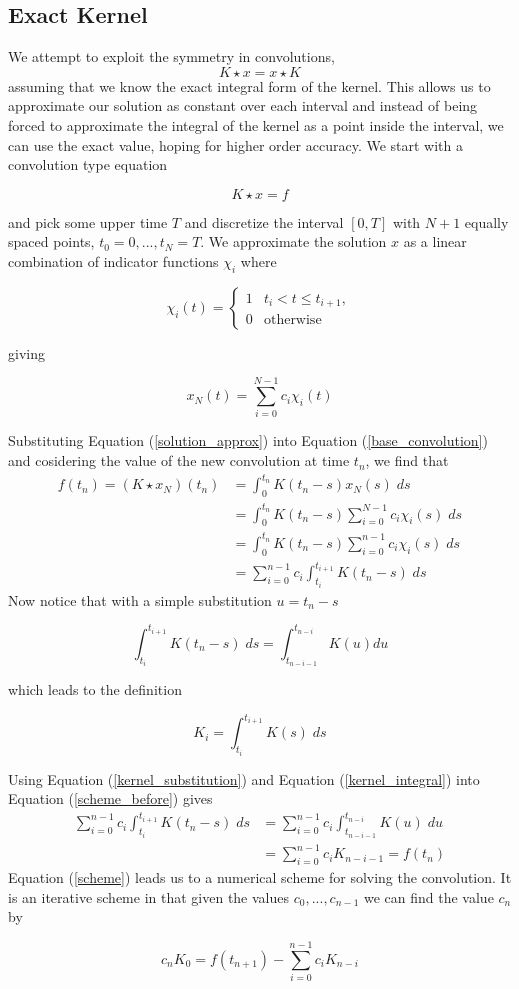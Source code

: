 \documentclass[11pt]{article}
\numberwithin{equation}{section}
\theoremstyle{definition}
\newcommand{\eqn}[2]{
  \begin{equation}
    \label{#1}
    #2
  \end{equation}
}
\newcommand{\eqr}[1]{Equation (\ref{#1})}
\begin{document}
\subsection{Exact Kernel}
We attempt to exploit the symmetry in convolutions, 
$$
  K \star x = x \star K
$$
assuming that we know the exact integral form of the kernel. This allows us to
approximate our solution as constant over each interval and instead of being forced
to approximate the integral of the kernel as a point inside the interval, we can
use the exact value, hoping for higher order accuracy.
We start with a convolution type equation
\eqn{base_convolution}{
  K \star x = f
}
and pick some upper time $T$ and discretize the interval $[0, T]$ with $N+1$
equally spaced points, $t_0 = 0, ..., t_N = T$. We approximate the solution $x$
as a linear combination of indicator functions $\chi_i$ where
\eqn{indicator_defn}{
  \chi_i(t)
  =
  \left\{
  \begin{array}{ll}
    1 & t_{i} < t \leq t_{i+1} , \\
    0 & \text{otherwise}
  \end{array}
  \right.
}
giving
\eqn{solution_approx}{
  x_N(t) = \sum_{i=0}^{N-1} c_i \chi_i(t)
}
Substituting \eqr{solution_approx} into \eqr{base_convolution} and cosidering
the value of the new convolution at time $t_n$, we find that
\begin{align}
\nonumber             f(t_n) = (K \star x_N)(t_n)
                        &= \int_0^{t_n} K(t_n - s)x_N(s)\; ds \\
\nonumber               &= \int_0^{t_n} K(t_n - s) \sum_{i=0}^{N-1} c_i \chi_i(s)\; ds \\
\nonumber               &= \int_0^{t_n} K(t_n - s) \sum_{i=0}^{n-1} c_i \chi_i(s)\; ds \\
\label{scheme_before}   &= \sum_{i=0}^{n-1} c_i \int_{t_i}^{t_{i+1}} K(t_n - s)\; ds
\end{align}
Now notice that with a simple substitution $u = t_n - s$
\eqn{kernel_substitution}{
  \int_{t_i}^{t_{i+1}}K(t_n - s)\; ds = \int_{t_{n-i-1}}^{t_{n-i}} K(u) du
}
which leads to the definition
\eqn{kernel_integral}{
  K_i = \int_{t_i}^{t_{i+1}} K(s)\; ds
}
Using \eqr{kernel_substitution} and \eqr{kernel_integral} into \eqr{scheme_before}
gives
\begin{align}
\nonumber       \sum_{i=0}^{n-1} c_i \int_{t_i}^{t_{i+1}} K(t_n - s)\; ds
                  &= \sum_{i=0}^{n-1} c_i \int_{t_{n-i-1}}^{t_{n-i}} K(u)\; du\\
\label{scheme}    &= \sum_{i=0}^{n-1} c_i K_{n-i-1} = f(t_n)
\end{align}
\eqr{scheme} leads us to a numerical scheme for solving the convolution. It is
an iterative scheme in that given the values $c_0, ..., c_{n-1}$ we can find
the value $c_n$ by
\eqn{specific_term}{
  c_nK_0 = f(t_{n+1}) - \sum_{i=0}^{n-1} c_i K_{n-i}
}
\end{document}
